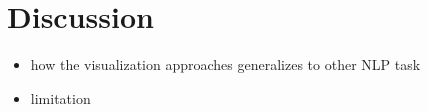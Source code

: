 \section{Discussion}

\begin{itemize}
    \item how the visualization approaches generalizes to other NLP task
    \item limitation
\end{itemize}

